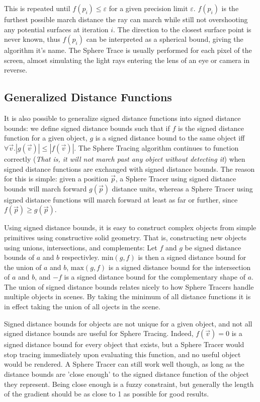 		This is repeated until $f(p_i) \leq \varepsilon$ for a given precision
		limit $\varepsilon$. $f(p_i)$ is the furthest possible march distance
		the ray can march while still not overshooting any potential surfaces
		at iteration $i$. The direction to the closest surface point is never
		known, thus $f(p_i)$ can be interpreted as a spherical bound, giving
		the algorithm it's name. The Sphere Trace is usually performed for each
		pixel of the screen, almost simulating the light rays entering the
		lens of an eye or camera in reverse.
		
		\subsection{Generalized Distance Functions} \label{CSG}

			It is also possible to generalize signed distance functions into
			signed distance bounds: we define signed distance bounds such that
			if $f$ is the signed distance function for a given object, $g$ is a
			signed distance bound to the same object iff $\forall{} \vec{v}.
			|g(\vec{v})| \leq |f(\vec{v})|$. The Sphere Tracing algorithm
			continues to function correctly (\emph{That is, it will not march
			past any object without detecting it}) when signed distance
			functions are exchanged with signed distance bounds. The reason for
			this is simple: given a position $\vec{p}$, a Sphere Tracer using
			signed distance bounds will march forward $g(\vec{p})$ distance
			units, whereas a Sphere Tracer using signed distance functions will
			march forward at least as far or further, since $f(\vec{p}) \geq
			g(\vec{p})$.

			Using signed distance bounds, it is easy to construct complex
			objects from simple primitives using constructive solid geometry.
			That is, constructing new objects using unions, intersections, and
			complements: Let $f$ and $g$ be signed distance bounds of $a$ and
			$b$ respectivley. $\textrm{min}(g, f)$ is then a signed distance
			bound for the union of $a$ and $b$, $\textrm{max}(g, f)$ is a
			signed distance bound for the intersection of $a$ and $b$, and $-f$
			is a signed distance bound for the complementary shape of
			$a$\cite{Hart1996}. The union of signed distance bounds relates nicely
			to how Sphere Tracers handle multiple objects in scenes. By taking
			the minimum of all distance functions it is in effect taking the
			union of all ojects in the scene.

			Signed distance bounds for objects are not unique for a given
			object, and not all signed distance bounds are useful for Sphere
			Tracing. Indeed, $f(\vec{v}) = 0$ is a signed distance bound for
			every object that exists, but a Sphere Tracer would stop tracing
			immediately upon evaluating this function, and no useful object
			would be rendered. A Sphere Tracer can still work well though, as
			long as the distance bounds are 'close enough' to the signed
			distance function of the object they represent\cite{InigoQuilez}. Being
			close enough is a fuzzy constraint, but generally the length of the
			gradient should be as close to 1 as possible for good
			results\cite{Keinert}.

